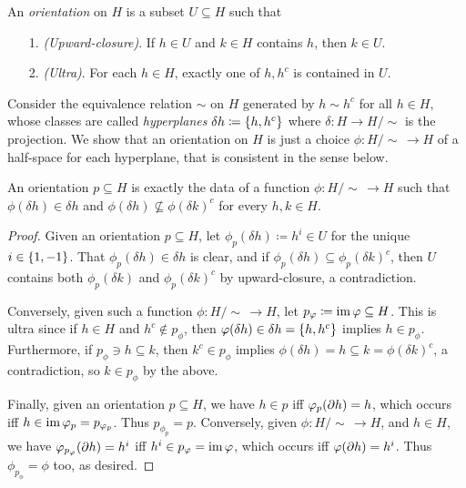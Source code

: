 \documentclass{amsart}
\begin{document}
    \begin{definition}
        An \textit{orientation} on $H$ is a subset $U\subseteq H$ such that
        \begin{enumerate}
            \item[1.] \textit{(Upward-closure)}. If $h\in U$ and $k\in H$ contains $h$, then $k\in U$.
            \item[2.] \textit{(Ultra)}. For each $h\in H$, exactly one of $h,h^c$ is contained in $U$.
        \end{enumerate}
    \end{definition}

    Consider the equivalence relation $\sim$ on $H$ generated by $h\sim h^c$ for all $h\in H$, whose classes are called \textit{hyperplanes} $\delta h\coloneqq\left\{h,h^c\right\}$ where $\delta:H\to H/\!\sim$ is the projection. We show that an orientation on $H$ is just a choice $\phi:H/\!\sim\,\to H$ of a half-space for each hyperplane, that is consistent in the sense below.

    \begin{proposition}\label{correspondence}
        An orientation $p\subseteq H$ is exactly the data of a function $\phi:H/\!\sim\,\to H$ such that $\phi(\delta h)\in\delta h$ and $\phi(\delta h)\not\subseteq\phi(\delta k)^c$ for every $h,k\in H$.
    \end{proposition}
    \begin{proof}
        Given an orientation $p\subseteq H$, let $\phi_p(\delta h)\coloneqq h^i\in U$ for the unique $i\in\left\{1,-1\right\}$. That $\phi_p(\delta h)\in\delta h$ is clear, and if $\phi_p(\delta h)\subseteq\phi_p(\delta k)^c$, then $U$ contains both $\phi_p(\delta k)$ and $\phi_p(\delta k)^c$ by upward-closure, a contradiction.

        Conversely, given such a function $\phi:H/\!\sim\,\to H$, let $p_\varphi\coloneqq\operatorname{im}\varphi\subseteq H$. This is ultra since if $h\in H$ and $h^c\not\in p_\phi$, then $\varphi(\delta h)\in\delta h=\left\{h,h^c\right\}$ implies $h\in p_\phi$. Furthermore, if $p_\phi\ni h\subseteq k$, then $k^c\in p_\phi$ implies $\phi(\delta h)=h\subseteq k=\phi(\delta k)^c$, a contradiction, so $k\in p_\phi$ by the above.

        Finally, given an orientation $p\subseteq H$, we have $h\in p$ iff $\varphi_p(\partial h)=h$, which occurs iff $h\in\operatorname{im}\varphi_p=p_{\varphi_p}$. Thus $p_{\phi_p}=p$. Conversely, given $\phi:H/\!\sim\,\to H$, and $h\in H$, we have $\varphi_{p_{\varphi}}(\partial h)=h^i$ iff $h^i\in p_\varphi=\operatorname{im}\varphi$, which occurs iff $\varphi(\partial h)=h^i$. Thus $\phi_{p_\phi}=\phi$ too, as desired.
    \end{proof}
\end{document}
